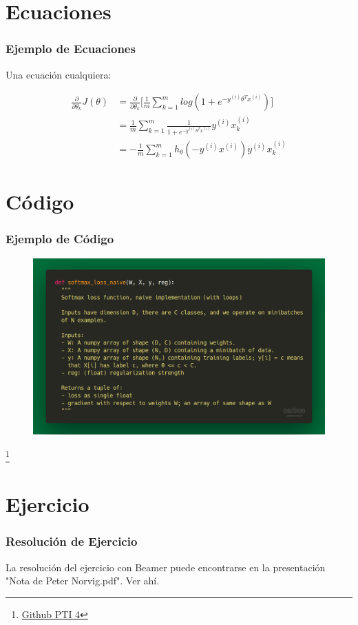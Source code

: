 \documentclass{IFES-beamer}
\begin{document}
\section{Ecuaciones}
\begin{frame}
\frametitle{Ejemplo de Ecuaciones}
Una ecuación cualquiera:

\begin{align*}
    \frac{\partial}{\partial \theta_k}J(\theta) 
        &= \frac{\partial}{\partial \theta_k}\Bigg[\frac{1}{m}\sum_{k=1}^m log(1+e^{-y^{(i)}\theta^Tx^{(i)}})\Bigg] \\
        &= \frac{1}{m}\sum_{k=1}^m \frac{1}{1+e^{-y^{(i)}\theta^Tx^{(i)}}}y^{(i)}x_k^{(i)} \\
        &= -\frac{1}{m}\sum_{k=1}^m h_\theta(-y^{(i)}x^{(i)})y^{(i)}x_k^{(i)}
\end{align*}
\end{frame}

\section{Código}
\begin{frame}
\frametitle{Ejemplo de Código}

\begin{figure}
\centering
\includegraphics[width=\linewidth]{Resources/code.png}
\end{figure}
\footnote{\href{https://github.com/Rodas171315/PTI_4-DylanR-LaTeX_Beamer.git}{Github PTI 4}}

\end{frame}

\section{Ejercicio}
\begin{frame}
\frametitle{Resolución de Ejercicio}
La resolución del ejercicio con Beamer puede encontrarse en la presentación "Nota de Peter Norvig.pdf". Ver ahí.
\end{frame}
\end{document}
